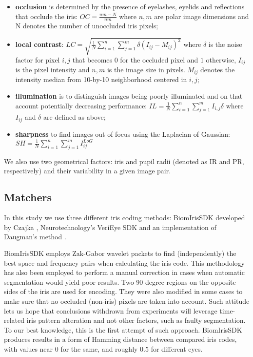 \documentclass{article}
\begin{document}
\begin{itemize}
\item \textbf{occlusion} is determined by the presence of eyelashes, eyelids and reflections that occlude the iris:
$OC = \frac{nm - N}{nm}$
where $n,m$ are polar image dimensions and N denotes the number of unoccluded iris pixels;
\item \textbf{local contrast}:
$LC = \sqrt{\frac{1}{N}\sum_{i=1}^{n}\sum_{j=1}^{m}\delta(I_{ij} - M_{ij})^2}$
where $\delta$ is the noise factor for pixel $i,j$ that becomes $0$ for the occluded pixel and $1$ otherwise, $I_{ij}$ is the pixel intensity and $n,m$ is the image size in pixels. $M_{ij}$ denotes the intensity median from 10-by-10 neighborhood centered in $i,j$;
\item \textbf{illumination} is to distinguish images being poorly illuminated and on that account potentially decreasing performance:
$IL = \frac{1}{N}\sum_{i=1}^{n}\sum_{j=1}^{m}I_{i,j}\delta$
where $I_{ij}$ and $\delta$ are defined as above;
\item \textbf{sharpness} to find images out of focus using the Laplacian of Gaussian:
$SH = \frac{1}{N}\sum_{i=1}^{n}\sum_{j=1}^{m}I^{LoG}_{ij}$
\end{itemize}
We also use two geometrical factors: iris and pupil radii (denoted as IR and PR, respectively) and their variability in a given image pair.


\subsection{Matchers}
In this study we use three different iris coding methods: BiomIrisSDK developed by Czajka \cite{BiomIrisSDK, CzajkaPacut}, Neurotechnology's VeriEye SDK \cite{VeriEye} and an implementation of Daugman's method \cite{Brize}. 

BiomIrisSDK employs Zak-Gabor wavelet packets to find (independently) the best space and frequency pairs when calculating the iris code. This methodology has also been employed to perform a manual correction in cases when automatic segmentation would yield poor results. Two 90-degree regions on the opposite sides of the iris are used for encoding. They were also modified in some cases to make sure that no occluded (non-iris) pixels are taken into account. Such attitude lets us hope that conclusions withdrawn from experiments will leverage time-related iris pattern alteration and not other factors, such as faulty segmentation. To our best knowledge, this is the first attempt of such approach. BiomIrisSDK produces results in a form of Hamming distance between compared iris codes, with values  near 0 for the same, and roughly 0.5 for different eyes. 
\end{document}
